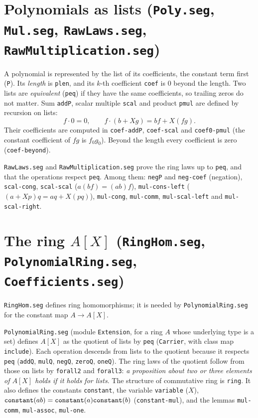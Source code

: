 \documentclass[11pt]{amsart}
\theoremstyle{definition}
\theoremstyle{remark}
\newcommand{\nm}[1]{\textup{\texttt{#1}}}
\newcommand{\file}[1]{\textup{\texttt{#1.seg}}}
\begin{document}
\section{Polynomials as lists (\file{Poly}, \file{Mul}, \file{RawLaws},
\file{RawMultiplication})}

A polynomial is represented by the list of its coefficients, the constant
term first (\nm{P}). Its \emph{length} is \nm{plen}, and its $k$-th
coefficient \nm{coef} is $0$ beyond the length. Two lists are
\emph{equivalent} (\nm{peq}) if they have the same coefficients, so
trailing zeros do not matter. Sum \nm{addP}, scalar multiple \nm{scal} and
product \nm{pmul} are defined by recursion on lists:
\[
  f\cdot 0 = 0,\qquad f\cdot(b + Xg) = bf + X(fg).
\]
Their coefficients are computed in \nm{coef-addP}, \nm{coef-scal} and
\nm{coef0-pmul} (the constant coefficient of $fg$ is $f_0g_0$). Beyond the
length every coefficient is zero (\nm{coef-beyond}).

\file{RawLaws} and \file{RawMultiplication} prove the ring laws up to
\nm{peq}, and that the operations respect \nm{peq}. Among them:
\nm{negP} and \nm{neg-coef} (negation), \nm{scal-cong}, \nm{scal-scal}
($a(bf) = (ab)f$), \nm{mul-cons-left} ($(a+Xp)q = aq + X(pq)$),
\nm{mul-cong}, \nm{mul-comm}, \nm{mul-scal-left} and \nm{mul-scal-right}.

\section{The ring $A[X]$ (\file{RingHom}, \file{PolynomialRing},
\file{Coefficients})}

\file{RingHom} defines ring homomorphisms; it is needed by
\file{PolynomialRing} for the constant map $A\to A[X]$.

\file{PolynomialRing} (module \nm{Extension}, for a ring $A$ whose
underlying type is a set) defines $A[X]$ as the quotient of lists by
\nm{peq} (\nm{Carrier}, with class map \nm{include}). Each operation
descends from lists to the quotient because it respects \nm{peq}
(\nm{addQ}, \nm{mulQ}, \nm{negQ}, \nm{zeroQ}, \nm{oneQ}). The ring laws
of the quotient follow from those on lists by \nm{forall2} and
\nm{forall3}: \emph{a proposition about two or three elements of $A[X]$
holds if it holds for lists}. The structure of commutative ring is
\nm{ring}. It also defines the constants \nm{constant}, the variable
\nm{variable} ($X$), $\nm{constant}(ab) = \nm{constant}(a)\nm{constant}(b)$
(\nm{constant-mul}), and the lemmas \nm{mul-comm}, \nm{mul-assoc},
\nm{mul-one}.
\end{document}
